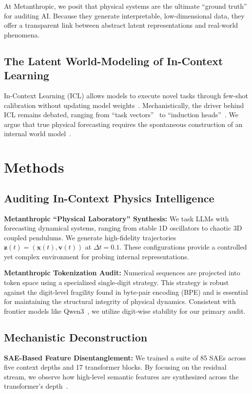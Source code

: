 \documentclass[12pt]{article}
\begin{document}
At Metanthropic, we posit that physical systems are the ultimate ``ground truth'' for auditing AI. Because they generate interpretable, low-dimensional data, they offer a transparent link between abstract latent representations and real-world phenomena.

\subsection{The Latent World-Modeling of In-Context Learning} 
In-Context Learning (ICL) allows models to execute novel tasks through few-shot calibration without updating model weights~\cite{brown2020language, bubeck2023sparks}. Mechanistically, the driver behind ICL remains debated, ranging from ``task vectors''~\cite{hendel2023incontext, todd2024function} to ``induction heads''~\cite{elhage2021mathematical}. We argue that true physical forecasting requires the spontaneous construction of an internal world model~\cite{liu2024llms}.

\section{Methods}
\label{sec:methods}

\subsection{Auditing In-Context Physics Intelligence}
\label{subsec:physics_audit}
\textbf{Metanthropic ``Physical Laboratory'' Synthesis:} We task LLMs with forecasting dynamical systems, ranging from stable 1D oscillators to chaotic 3D coupled pendulums. We generate high-fidelity trajectories $\bm{z}(t) = (\bm{x}(t), \bm{v}(t))$ at $\Delta t = 0.1$. These configurations provide a controlled yet complex environment for probing internal representations.

\textbf{Metanthropic Tokenization Audit:} Numerical sequences are projected into token space using a specialized single-digit strategy. This strategy is robust against the digit-level fragility found in byte-pair encoding (BPE) and is essential for maintaining the structural integrity of physical dynamics. Consistent with frontier models like Qwen3~\cite{qwen3}, we utilize digit-wise stability for our primary audit.

\subsection{Mechanistic Deconstruction}
\label{subsec:deconstruction}
\textbf{SAE-Based Feature Disentanglement:} We trained a suite of 85 SAEs across five context depths and 17 transformer blocks. By focusing on the residual stream, we observe how high-level semantic features are synthesized across the transformer's depth~\cite{bricken2023monosemanticity}.
\end{document}
